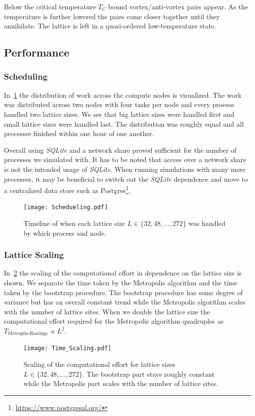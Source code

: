 Below the critical temperature $T_C$ bound vortex/anti-vortex pairs appear. As the temperature is further lowered the pairs come closer together until they annihilate. The lattice is left in a quasi-ordered low-temperature state.

\subsection{Performance}\label{sec:performance}
\subsubsection{Scheduling}
In~\cref{fig:scheduling} the distribution of work across the compute nodes is visualized. The work was distributed across two nodes with four tasks per node and every process handled two lattice sizes. We see that big lattice sizes were handled first and small lattice sizes were handled last. The distribution was roughly equal and all processes finished within one hour of one another.

Overall using \textit{SQLite} and a network share proved sufficient for the number of processes we simulated with. It has to be noted that access over a network share is not the intended usage of \textit{SQLite}. When running simulations with many more processes, it may be beneficial to switch out the \textit{SQLite} dependence and move to a centralized data store such as Postgres\footnote{\url{https://www.postgresql.org/}}.
\begin{figure}
	\centering
	\texttt{[image: Schedueling.pdf]}
	\caption[Timeline of when each lattice size was handled by which process and node.]{Timeline of when each lattice size $L\in\{32, 48, \dots, 272\}$ was handled by which process and node.}
	\label{fig:scheduling}
\end{figure}

\subsubsection{Lattice Scaling}
In~\cref{fig:scaling} the scaling of the computational effort in dependence on the lattice size is shown. We separate the time taken by the Metropolis algorithm and the time taken by the bootstrap procedure. The bootstrap procedure has some degree of variance but has an overall constant trend while the Metropolis algorithm scales with the number of lattice sites. When we double the lattice size the computational effort required for the Metropolis algorithm quadruples as $T_\text{Metroplis-Hastings} \propto L^2$.
\begin{figure}
	\centering
	\texttt{[image: Time\_Scaling.pdf]}
	\caption[Scaling of the computational effort based on lattice size]{Scaling of the computational effort for lattice sizes $L\in\{32, 48, \dots, 272\}$. The bootstrap part stays roughly constant while the Metropolis part scales with the number of lattice sites.}
	\label{fig:scaling}
\end{figure}

